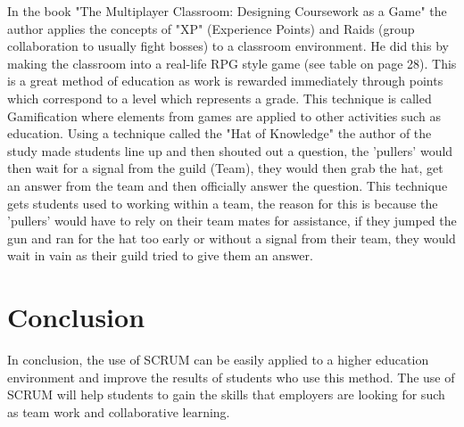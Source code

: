 \documentclass[11pt]{scrartcl}
\begin{document}
In the book "The Multiplayer Classroom: Designing Coursework as a Game" the author applies the concepts of "XP" (Experience Points) and Raids (group collaboration to usually fight bosses) to a classroom environment. He did this by making the classroom into a real-life RPG style game (see table on page 28\cite{sheldon2011multiplayer}). This is a great method of education as work is rewarded immediately through points which correspond to a level which represents a grade. This technique is called Gamification where elements from games are applied to other activities such as education. Using a technique called the "Hat of Knowledge" the author of the study made students line up and then shouted out a question, the 'pullers' would then wait for a signal from the guild (Team), they would then grab the hat, get an answer from the team and then officially answer the question. This technique gets students used to working within a team, the reason for this is because the 'pullers' would have to rely on their team mates for assistance, if they jumped the gun and ran for the hat too early or without a signal from their team, they would wait in vain as their guild tried to give them an answer.

\section{Conclusion}

In conclusion, the use of SCRUM can be easily applied to a higher education environment and improve the results of students who use this method. The use of SCRUM will help students to gain the skills that employers are looking for such as team work and collaborative learning. 



\end{document}
